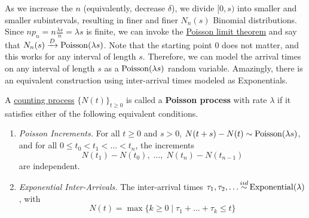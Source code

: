 	As we increase the $n$ (equivalently, decrease $\delta$), we divide $[0, s)$ into smaller and smaller subintervals, resulting in finer and finer $N_n(s)$ Binomial distributions. Since $n p_n = n \frac{\lambda s}{n} = \lambda s$ is finite, we can invoke the \hyperref[thm:poisson-limit-theorem]{Poisson limit theorem} and say that $N_n (s) \xrightarrow{D} \operatorname{Poisson}(\lambda s)$. Note that the starting point $0$ does not matter, and this works for any interval of length $s$. Therefore, we can model the arrival times on any interval of length $s$ as a $\operatorname{Poisson}(\lambda s)$ random variable. Amazingly, there is an equivalent construction using inter-arrival times modeled as Exponentials. 

	\begin{definition}
		\label{def:poisson-process}
		A \hyperref[def:counting-process]{counting process} $\{N(t)\}_{t \geq 0}$ is called a \textbf{Poisson process} with rate $\lambda$ if it satisfies either of the following equivalent conditions.
		\begin{enumerate}
			\item \textit{Poisson Increments.} For all $t \geq 0$ and $s > 0$, $N(t + s) - N(t) \sim \operatorname{Poisson}(\lambda s)$, and for all $0 \leq t_0 < t_1 < \ldots < t_n$, the increments
				\begin{equation}
					N(t_1) - N(t_0), \; \ldots, \; N(t_n) - N(t_{n-1})
				\end{equation}
			are independent.

			\item \textit{Exponential Inter-Arrivals.} The inter-arrival times $\tau_1, \tau_2, \ldots \iidsim \Exponential(\lambda)$, with 
				\begin{equation}
					N(t) = \max\{k \geq 0 \mid \tau_1 + \ldots + \tau_k \leq t\}
				\end{equation}
		\end{enumerate}
	\end{definition}
